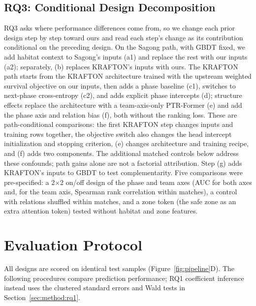 \documentclass[sigconf,anonymous,nonacm]{acmart}
\begin{document}
\subsection{RQ3: Conditional Design Decomposition}
\label{sec:method:decomposition}
RQ3 asks where performance differences come from, so we change each prior design step by step toward ours and read each step's change as its contribution conditional on the preceding design.
On the Sagong path, with GBDT fixed, we add habitat context to Sagong's inputs (a1) and replace the rest with our inputs (a2); separately, (b) replaces KRAFTON's inputs with ours.
The KRAFTON path starts from the KRAFTON architecture trained with the upstream weighted survival objective on our inputs, then adds a phase baseline (c1), switches to next-phase cross-entropy (c2), and adds explicit phase intercepts (d); structure effects replace the architecture with a team-axis-only PTR-Former (e) and add the phase axis and relation bias (f), both without the ranking loss.
These are path-conditional comparisons: the first KRAFTON step changes inputs and training rows together, the objective switch also changes the head intercept initialization and stopping criterion, (e) changes architecture and training recipe, and (f) adds two components. The additional matched controls below address these confounds; path gains alone are not a factorial attribution.
Step (g) adds KRAFTON's inputs to GBDT to test complementarity.
Five comparisons were pre-specified: a 2$\times$2 on/off design of the phase and team axes (AUC for both axes and, for the team axis, Spearman rank correlation within matches), a control with relations shuffled within matches, and a zone token (the safe zone as an extra attention token) tested without habitat and zone features.

\section{Evaluation Protocol}
\label{sec:method:evaluation}
All designs are scored on identical test samples (Figure~\ref{fig:pipeline}D). The following procedures compare prediction performance; RQ1 coefficient inference instead uses the clustered standard errors and Wald tests in Section~\ref{sec:method:rq1}.
\end{document}
